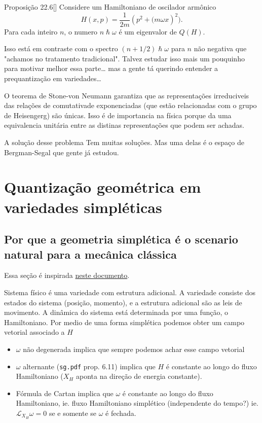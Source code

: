 \begin{thing4}{Proposição 22.6}[\cite{hallq}]\leavevmode
	Considere um Hamiltoniano de oscilador armônico
	\[H(x,p)=\frac{1}{2m}(p^2+\Big(m \omega x)^2\Big).\]
	Para cada inteiro $n$, o numero $n\hslash \omega$ é um eigenvalor de $Q(H)$.
\end{thing4}
Isso está em contraste com o spectro $(n+1/2)\hslash \omega$ para $n$  não negativa que "achamos no tratamento tradicional". {\color{2}Talvez estudar isso mais um pouquinho para motivar melhor essa parte… mas a gente tá querindo entender a prequantização em variedades…}

\begin{remark}\leavevmode
	O teorema de Stone-von Neumann garantiza que as representações irreduciveis das relações de comutativade exponenciadas (que estão relacionadas com o grupo de Heisengerg) são únicas. Isso é de importancia na física porque da uma equivalencia unitária entre as distinas representações que podem ser achadas.
\end{remark}


\begin{thing3}{A solução desse problema}\leavevmode
	Tem muitas soluções. Mas uma delas é o espaço de Bergman-Segal que gente já estudou.
\end{thing3}

\section{Quantização geométrica em variedades simpléticas}

\subsection{Por que a geometria simplética é o scenario natural para a mecânica clássica}

Essa seção é inspirada \href{https://cohn.mit.edu/symplectic/}{neste documento}.

Sistema f\'isico \'e uma variedade com estrutura adicional. A variedade consiste dos estados do sistema (posi\c c\~ao, momento), e a estrutura adicional s\~ao as leis de movimento. A din\^amica do sistema est\'a determinada por uma fun\c c\~ao, o Hamiltoniano. Por medio de uma forma simpl\'etica podemos obter um campo vetorial associado a $H$ 

\begin{itemize}
\item $\omega$ n\~ao degenerada implica que sempre podemos achar esse campo vetorial

\item  $\omega$ alternante (\texttt{sg.pdf} prop. 6.11) implica que $H$ \'e constante ao longo do fluxo Hamiltoniano ($X_H$ aponta na  dire\c c\~ao de energia constante).

\item F\'ormula de Cartan implica que $\omega$  \'e constante ao longo do fluxo Hamiltoniano, ie. fluxo Hamiltoniano simpl\'etico (independente do tempo?) ie. $\mathcal{L}_{X_H}\omega=0$ se e somente se $\omega$ \'e fechada.
\end{itemize}

